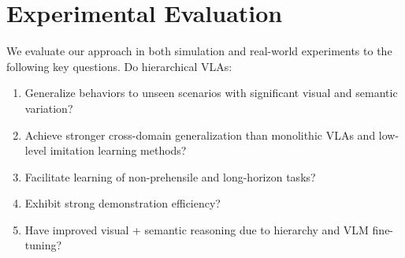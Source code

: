 \vspace{-2mm}
\section{Experimental Evaluation}
\vspace{-2mm}

We evaluate our approach in both simulation and real-world experiments to the following key questions. Do hierarchical VLAs:
\begin{enumerate}[label=\textbf{Q\arabic*}, nosep]
    \item \label{q1} Generalize behaviors to unseen scenarios with significant visual and semantic variation?
    \item \label{q2} Achieve stronger cross-domain generalization than monolithic VLAs and low-level imitation learning methods?
    \item \label{q3} Facilitate learning of non-prehensile and long-horizon tasks?
    \item \label{q4} Exhibit strong demonstration efficiency?
    \item \label{q5} Have improved visual + semantic reasoning due to hierarchy and VLM fine-tuning?
\end{enumerate}



